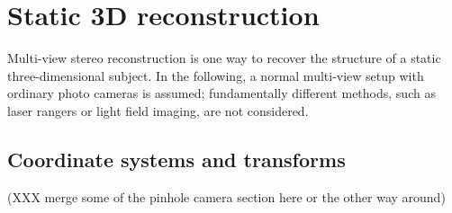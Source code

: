
\clearpage
\section{Static 3D reconstruction}

Multi-view stereo reconstruction is one way to recover the structure of a static three-dimensional subject.
In the following, a normal multi-view setup with ordinary photo cameras is assumed;
fundamentally different methods, such as laser rangers or light field imaging, are not considered.














\subsection{Coordinate systems and transforms} \label{sec:coord} %

(XXX merge some of the pinhole camera section here or the other way around)

